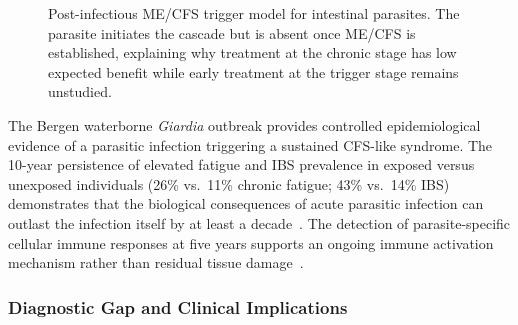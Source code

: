 \begin{figure}[h]
\centering
{}
\caption{Post-infectious ME/CFS trigger model for intestinal parasites. The parasite initiates the cascade but is absent once ME/CFS is established, explaining why treatment at the chronic stage has low expected benefit while early treatment at the trigger stage remains unstudied.}
\label{fig:parasite-trigger-model}
\end{figure}

\begin{observation}
\label{obs:giardia-mecfs}
The Bergen waterborne \emph{Giardia} outbreak provides controlled epidemiological evidence of a parasitic infection triggering a sustained CFS-like syndrome. The 10-year persistence of elevated fatigue and IBS prevalence in exposed versus unexposed individuals (26\% vs.\ 11\% chronic fatigue; 43\% vs.\ 14\% IBS) demonstrates that the biological consequences of acute parasitic infection can outlast the infection itself by at least a decade~\cite{Wensaas2018giardia10yr}. The detection of parasite-specific cellular immune responses at five years supports an ongoing immune activation mechanism rather than residual tissue damage~\cite{Bolstad2017giardia_immune}.
\end{observation}

\subsubsection{Diagnostic Gap and Clinical Implications}

